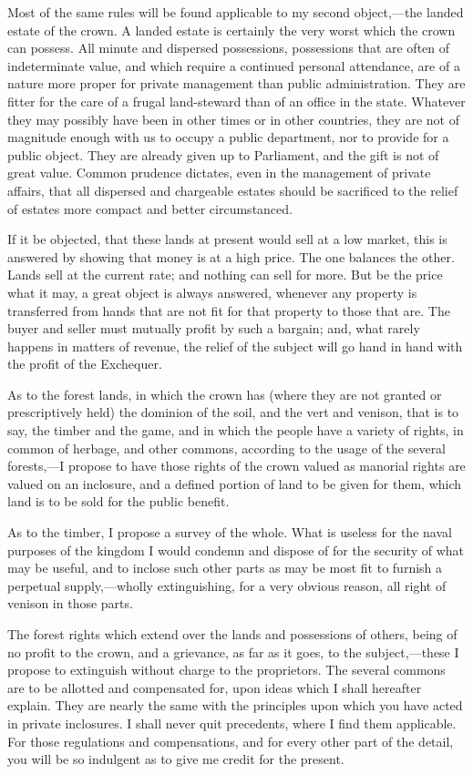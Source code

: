 Most of the same rules will be found applicable to my second object,—the landed estate of the crown. A landed estate is certainly the very worst which the crown can possess. All minute and dispersed possessions, possessions that are often of indeterminate value, and which require a continued personal attendance, are of a nature more proper for private management than public administration. They are fitter for the care of a frugal land-steward than of an office in the state. Whatever they may possibly have been in other times or in other countries, they are not of magnitude enough with us to occupy a public department, nor to provide for a public object. They are already given up to Parliament, and the gift is not of great value. Common prudence dictates, even in the management of private affairs, that all dispersed and chargeable estates should be sacrificed to the relief of estates more compact and better circumstanced.

If it be objected, that these lands at present would sell at a low market, this is answered by showing that money is at a high price. The one balances the other. Lands sell at the current rate; and nothing can sell for more. But be the price what it may, a great object is always answered, whenever any property is transferred from hands that are not fit for that property to those that are. The buyer and seller must mutually profit by such a bargain; and, what rarely happens in matters of revenue, the relief of the subject will go hand in hand with the profit of the Exchequer.

As to the forest lands, in which the crown has (where they are not granted or prescriptively held) the dominion of the soil, and the vert and venison, that is to say, the timber and the game, and in which the people have a variety of rights, in common of herbage, and other commons, according to the usage of the several forests,—I propose to have those rights of the crown valued as manorial rights are valued on an inclosure, and a defined portion of land to be given for them, which land is to be sold for the public benefit.

As to the timber, I propose a survey of the whole. What is useless for the naval purposes of the kingdom I would condemn and dispose of for the security of what may be useful, and to inclose such other parts as may be most fit to furnish a perpetual supply,—wholly extinguishing, for a very obvious reason, all right of venison in those parts.

The forest rights which extend over the lands and possessions of others, being of no profit to the crown, and a grievance, as far as it goes, to the subject,—these I propose to extinguish without charge to the proprietors. The several commons are to be allotted and compensated for, upon ideas which I shall hereafter explain. They are nearly the same with the principles upon which you have acted in private inclosures. I shall never quit precedents, where I find them applicable. For those regulations and compensations, and for every other part of the detail, you will be so indulgent as to give me credit for the present.

